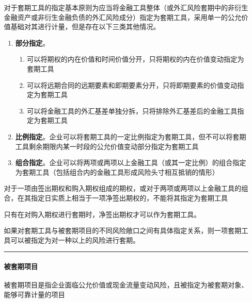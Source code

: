 \documentclass[UTF8,12pt]{ctexart}
\numberwithin{equation}{section} %
\numberwithin{figure}{section}
\numberwithin{table}{section}
\begin{document}
	对于套期工具的指定基本原则为应当将金融工具整体（或外汇风险套期中的非衍生金融资产或非衍生金融负债的外汇风险成分）指定为套期工具，采用单一的公允价值基础对其进行计量，但是存在以下三类其他情况。
	\begin{enumerate}
		\item \textbf{部分指定}。
		\begin{enumerate}
			\item 可以将期权的内在价值和时间价值分开，只将期权的内在价值变动指定为套期工具
			
			\item 可以将远期合同的远期要素和即期要素分开，只将即期要素的价值变动指定为套期工具
			
			\item 可以将金融工具的外汇基差单独分拆，只将排除外汇基差后的金融工具指定为套期工具
			
		\end{enumerate}
		
		\item \textbf{比例指定}。企业可以将套期工具的一定比例指定为套期工具，但不可以将套期工具剩余期限内某一时段的公允价值变动部分指定为套期工具
		
		\item \textbf{组合指定}。企业可以将两项或两项以上金融工具（或其一定比例）的组合指定为套期工具（包括组合内的金融工具形成风险头寸相互抵销的情形）
	\end{enumerate}
	
	对于一项由签出期权和购入期权组成的期权，或对于两项或两项以上金融工具的组合，在其指定日实质上相当于一项净签出期权的，不能将其指定为套期工具
	
	只有在对购入期权进行套期时，净签出期权才可以作为套期工具。
	
	如果对套期工具与被套期项目的不同风险敞口之间有具体指定关系，则一项套期工具可以被指定为对一种以上的风险进行套期。
	
	\vspace{5pt}
	\hrule
	\vspace{5pt}
	
	\paragraph{被套期项目}
	被套期项目是指企业面临公允价值或现金流量变动风险，且被指定为被套期对象、能够可靠计量的项目
	
\end{document}
